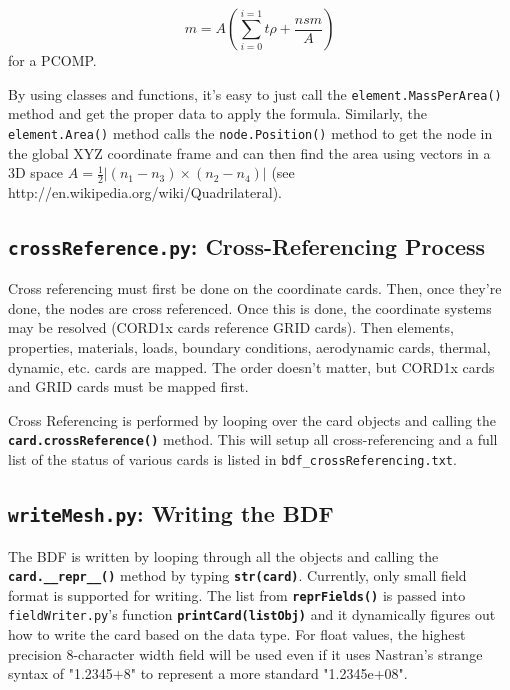      {\begin{equation} m=A (\sum_{i=0}^{i=1}{t\rho} + \frac{nsm}{A} )  \end{equation} } for a PCOMP.
     

     By using classes and functions, it's easy to just call the {\tt element.MassPerArea()} method and get the proper data to apply the formula.  Similarly, the {\tt element.Area()} method calls the {\tt node.Position()} method to get the node in the global XYZ coordinate frame and can then find the area using vectors in a 3D space
     $ A=\frac{1}{2} | (n_1-n_3) \times (n_2-n_4) | $ (see http://en.wikipedia.org/wiki/Quadrilateral).
 
 
 \subsection{{\tt crossReference.py}: Cross-Referencing Process}
     Cross referencing must first be done on the coordinate cards.  Then, once they're done, the nodes are cross referenced.  Once this is done, the coordinate systems may be resolved (CORD1x cards reference GRID cards).  Then elements, properties, materials, loads, boundary conditions, aerodynamic cards, thermal, dynamic, etc. cards are mapped.  The order doesn't matter, but CORD1x cards and GRID cards must be mapped first.
     
     Cross Referencing is performed by looping over the card objects and calling the {\bf \tt card.crossReference()} method.  This will setup all cross-referencing and a full list of the status of various cards is listed in {\tt bdf\_crossReferencing.txt}.

 \subsection{{\tt writeMesh.py}: Writing the BDF}
     The BDF is written by looping through all the objects and calling the {\bf \tt card.\_\_repr\_\_()} method by typing {\bf \tt str(card)}.
     Currently, only small field format is supported for writing.  The list from {\bf \tt reprFields()} is passed into {\tt fieldWriter.py}'s function {\bf \tt printCard(listObj)} and it dynamically figures out how to write the card based on the data type.  For float values, the highest precision 8-character width field will be used even if it uses Nastran's strange syntax of "1.2345+8" to represent a more standard "1.2345e+08".
